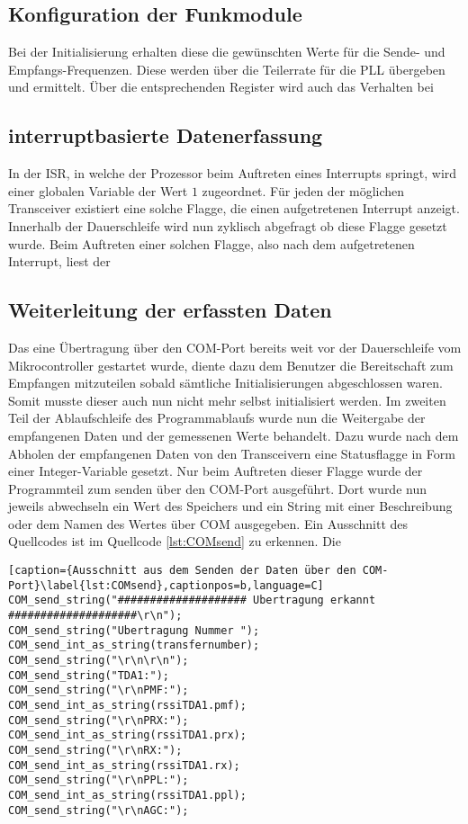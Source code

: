 

\subsection{Konfiguration der Funkmodule}

 Bei der Initialisierung erhalten diese die gewünschten Werte für die Sende- und Empfangs-Frequenzen. Diese werden über die Teilerrate für die  \ac{PLL} übergeben und ermittelt. Über die entsprechenden Register wird auch das Verhalten bei
\subsection{interruptbasierte Datenerfassung}



In der \acl{ISR}, in welche der Prozessor beim Auftreten eines Interrupts springt, wird einer globalen Variable der Wert $1$ zugeordnet. Für jeden der möglichen Transceiver existiert eine solche Flagge, die einen aufgetretenen Interrupt anzeigt. Innerhalb der Dauerschleife wird nun zyklisch abgefragt ob diese Flagge gesetzt wurde. Beim Auftreten einer solchen Flagge, also nach dem aufgetretenen Interrupt, liest der 






\subsection{Weiterleitung der erfassten Daten}
Das eine Übertragung über den COM-Port bereits weit vor der Dauerschleife vom Mikrocontroller gestartet wurde, diente dazu dem Benutzer  die Bereitschaft zum Empfangen mitzuteilen sobald sämtliche Initialisierungen abgeschlossen waren. Somit musste dieser auch nun nicht mehr selbst initialisiert werden.
Im zweiten Teil der Ablaufschleife des Programmablaufs wurde nun die Weitergabe der empfangenen Daten und der gemessenen Werte behandelt. Dazu wurde nach dem Abholen der empfangenen Daten von den Transceivern eine Statusflagge in Form einer Integer-Variable gesetzt. Nur beim Auftreten dieser Flagge wurde der Programmteil zum senden über den COM-Port ausgeführt.
Dort wurde nun jeweils abwechseln ein Wert des Speichers und ein String mit einer Beschreibung oder dem Namen des Wertes über COM ausgegeben. Ein Ausschnitt des Quellcodes ist im Quellcode \ref{lst:COMsend} zu erkennen. Die

\begin{lstlisting}[caption={Ausschnitt aus dem Senden der Daten über den COM-Port}\label{lst:COMsend},captionpos=b,language=C]
COM_send_string("#################### Ubertragung erkannt ####################\r\n");
COM_send_string("Ubertragung Nummer ");
COM_send_int_as_string(transfernumber);
COM_send_string("\r\n\r\n");
COM_send_string("TDA1:");
COM_send_string("\r\nPMF:");
COM_send_int_as_string(rssiTDA1.pmf);
COM_send_string("\r\nPRX:");
COM_send_int_as_string(rssiTDA1.prx);
COM_send_string("\r\nRX:");
COM_send_int_as_string(rssiTDA1.rx);
COM_send_string("\r\nPPL:");
COM_send_int_as_string(rssiTDA1.ppl);
COM_send_string("\r\nAGC:");
\end{lstlisting}


